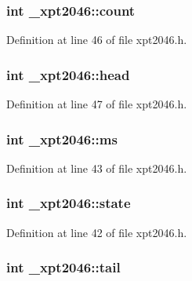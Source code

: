 \subsubsection[{\texorpdfstring{count}{count}}]{\setlength{\rightskip}{0pt plus 5cm}int \+\_\+xpt2046\+::count}\hypertarget{struct__xpt2046_affdd5680717fb00e5f975c0472ed32f1}{}\label{struct__xpt2046_affdd5680717fb00e5f975c0472ed32f1}


Definition at line 46 of file xpt2046.\+h.

\subsubsection[{\texorpdfstring{head}{head}}]{\setlength{\rightskip}{0pt plus 5cm}int \+\_\+xpt2046\+::head}\hypertarget{struct__xpt2046_a8b4e70a2d7a60543902ac8648c986a31}{}\label{struct__xpt2046_a8b4e70a2d7a60543902ac8648c986a31}


Definition at line 47 of file xpt2046.\+h.

\subsubsection[{\texorpdfstring{ms}{ms}}]{\setlength{\rightskip}{0pt plus 5cm}int \+\_\+xpt2046\+::ms}\hypertarget{struct__xpt2046_a7ada38c703d34310580fbdb4625a5190}{}\label{struct__xpt2046_a7ada38c703d34310580fbdb4625a5190}


Definition at line 43 of file xpt2046.\+h.

\subsubsection[{\texorpdfstring{state}{state}}]{\setlength{\rightskip}{0pt plus 5cm}int \+\_\+xpt2046\+::state}\hypertarget{struct__xpt2046_a271e59b1fe899e8d1199f617bd381b15}{}\label{struct__xpt2046_a271e59b1fe899e8d1199f617bd381b15}


Definition at line 42 of file xpt2046.\+h.

\subsubsection[{\texorpdfstring{tail}{tail}}]{\setlength{\rightskip}{0pt plus 5cm}int \+\_\+xpt2046\+::tail}\hypertarget{struct__xpt2046_a22287733194e6d32116347f39f77523f}{}\label{struct__xpt2046_a22287733194e6d32116347f39f77523f}


